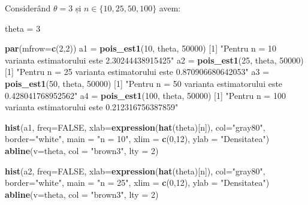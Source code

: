\documentclass[
]{article}
\newenvironment{Shaded}{\begin{snugshade}}{\end{snugshade}}
\newcommand{\DataTypeTok}[1]{\textcolor[rgb]{0.13,0.29,0.53}{#1}}
\newcommand{\DecValTok}[1]{\textcolor[rgb]{0.00,0.00,0.81}{#1}}
\newcommand{\KeywordTok}[1]{\textcolor[rgb]{0.13,0.29,0.53}{\textbf{#1}}}
\newcommand{\NormalTok}[1]{#1}
\newcommand{\OtherTok}[1]{\textcolor[rgb]{0.56,0.35,0.01}{#1}}
\newcommand{\StringTok}[1]{\textcolor[rgb]{0.31,0.60,0.02}{#1}}
\begin{document}
Considerând \(\theta = 3\) și \(n\in\{10,25,50,100\}\) avem:

\begin{Shaded}
\begin{Highlighting}[]
\NormalTok{theta =}\StringTok{ }\DecValTok{3}

\KeywordTok{par}\NormalTok{(}\DataTypeTok{mfrow=}\KeywordTok{c}\NormalTok{(}\DecValTok{2}\NormalTok{,}\DecValTok{2}\NormalTok{))}
\NormalTok{a1 =}\StringTok{ }\KeywordTok{pois_est1}\NormalTok{(}\DecValTok{10}\NormalTok{, theta, }\DecValTok{50000}\NormalTok{)}
\NormalTok{[}\DecValTok{1}\NormalTok{] }\StringTok{"Pentru n = 10 varianta estimatorului este 2.30244438915425"}
\NormalTok{a2 =}\StringTok{ }\KeywordTok{pois_est1}\NormalTok{(}\DecValTok{25}\NormalTok{, theta, }\DecValTok{50000}\NormalTok{)}
\NormalTok{[}\DecValTok{1}\NormalTok{] }\StringTok{"Pentru n = 25 varianta estimatorului este 0.870906680642053"}
\NormalTok{a3 =}\StringTok{ }\KeywordTok{pois_est1}\NormalTok{(}\DecValTok{50}\NormalTok{, theta, }\DecValTok{50000}\NormalTok{)}
\NormalTok{[}\DecValTok{1}\NormalTok{] }\StringTok{"Pentru n = 50 varianta estimatorului este 0.428041768952562"}
\NormalTok{a4 =}\StringTok{ }\KeywordTok{pois_est1}\NormalTok{(}\DecValTok{100}\NormalTok{, theta, }\DecValTok{50000}\NormalTok{)}
\NormalTok{[}\DecValTok{1}\NormalTok{] }\StringTok{"Pentru n = 100 varianta estimatorului este 0.212316756387859"}


\KeywordTok{hist}\NormalTok{(a1, }\DataTypeTok{freq=}\OtherTok{FALSE}\NormalTok{, }\DataTypeTok{xlab=}\KeywordTok{expression}\NormalTok{(}\KeywordTok{hat}\NormalTok{(theta)[n]), }
     \DataTypeTok{col=}\StringTok{"gray80"}\NormalTok{, }\DataTypeTok{border=}\StringTok{"white"}\NormalTok{, }\DataTypeTok{main =} \StringTok{"n = 10"}\NormalTok{, }\DataTypeTok{xlim =} \KeywordTok{c}\NormalTok{(}\DecValTok{0}\NormalTok{,}\DecValTok{12}\NormalTok{),}
     \DataTypeTok{ylab =} \StringTok{"Densitatea"}\NormalTok{)}
\KeywordTok{abline}\NormalTok{(}\DataTypeTok{v=}\NormalTok{theta, }\DataTypeTok{col =} \StringTok{"brown3"}\NormalTok{, }\DataTypeTok{lty =} \DecValTok{2}\NormalTok{)}

\KeywordTok{hist}\NormalTok{(a2, }\DataTypeTok{freq=}\OtherTok{FALSE}\NormalTok{, }\DataTypeTok{xlab=}\KeywordTok{expression}\NormalTok{(}\KeywordTok{hat}\NormalTok{(theta)[n]), }
     \DataTypeTok{col=}\StringTok{"gray80"}\NormalTok{, }\DataTypeTok{border=}\StringTok{"white"}\NormalTok{, }\DataTypeTok{main =} \StringTok{"n = 25"}\NormalTok{, }\DataTypeTok{xlim =} \KeywordTok{c}\NormalTok{(}\DecValTok{0}\NormalTok{,}\DecValTok{12}\NormalTok{),}
     \DataTypeTok{ylab =} \StringTok{"Densitatea"}\NormalTok{)}
\KeywordTok{abline}\NormalTok{(}\DataTypeTok{v=}\NormalTok{theta, }\DataTypeTok{col =} \StringTok{"brown3"}\NormalTok{, }\DataTypeTok{lty =} \DecValTok{2}\NormalTok{)}


\end{Highlighting}
\end{Shaded}
\end{document}
